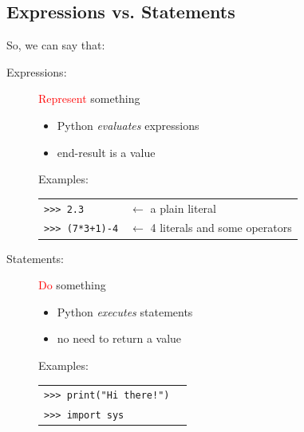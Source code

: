 \documentclass[t,handout,9pt]{beamer}
\begin{document}
\subsection{Expressions vs. Statements}
\begin{frame}
\vfill
So, we can say that:
\begin{description}
\item[Expressions:] \textcolor{red}{Represent} something\\
\begin{itemize}
	\item Python \textit{evaluates} expressions
	\item end-result is a value
\end{itemize}
Examples:
\begin{table}[]
\begin{flushleft}
\begin{tabular}{ll}
\texttt{>{}>{}> 2.3} & $\leftarrow$ a plain literal\\
\texttt{>{}>{}> (7*3+1)-4} & $\leftarrow$ 4 literals and some operators\\
\end{tabular}
\end{flushleft}
\end{table}
\item[Statements:] \textcolor{red}{Do} something\\
\begin{itemize}
	\item Python \textit{executes} statements
	\item no need to return a value
\end{itemize}
Examples:
\begin{table}[]
\begin{flushleft}
\begin{tabular}{ll}
\texttt{>{}>{}> print("Hi there!")} & \\
\texttt{>{}>{}> import sys} & \\
\end{tabular}
\end{flushleft}
\end{table}
\end{description}
\vfill
\end{frame}
\end{document}
